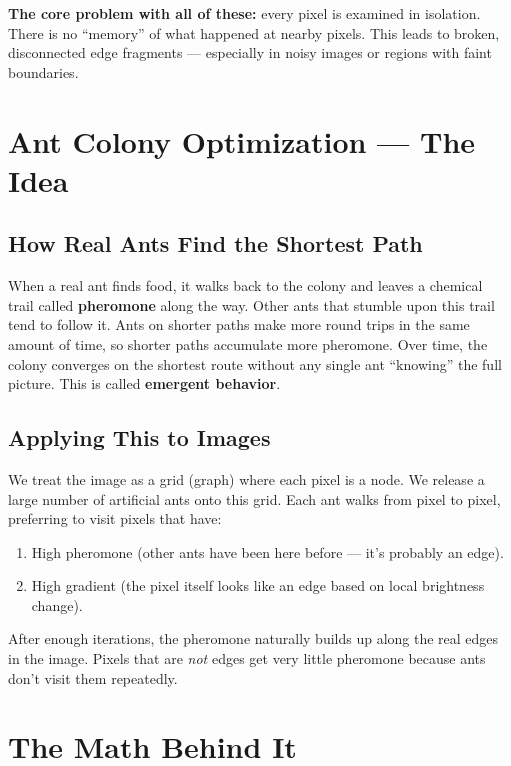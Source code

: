 \documentclass[12pt,a4paper]{article}
\begin{document}
\textbf{The core problem with all of these:} every pixel is examined in isolation. There is no ``memory'' of what happened at nearby pixels. This leads to broken, disconnected edge fragments --- especially in noisy images or regions with faint boundaries.

\section{Ant Colony Optimization --- The Idea}

\subsection{How Real Ants Find the Shortest Path}
When a real ant finds food, it walks back to the colony and leaves a chemical trail called \textbf{pheromone} along the way. Other ants that stumble upon this trail tend to follow it. Ants on shorter paths make more round trips in the same amount of time, so shorter paths accumulate more pheromone. Over time, the colony converges on the shortest route without any single ant ``knowing'' the full picture. This is called \textbf{emergent behavior}.

\subsection{Applying This to Images}
We treat the image as a grid (graph) where each pixel is a node. We release a large number of artificial ants onto this grid. Each ant walks from pixel to pixel, preferring to visit pixels that have:
\begin{enumerate}
    \item High pheromone (other ants have been here before --- it's probably an edge).
    \item High gradient (the pixel itself looks like an edge based on local brightness change).
\end{enumerate}

After enough iterations, the pheromone naturally builds up along the real edges in the image. Pixels that are \textit{not} edges get very little pheromone because ants don't visit them repeatedly.

\section{The Math Behind It}
\end{document}
